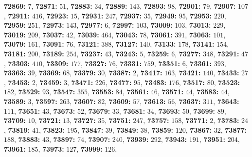 \textsf{\bfseries 72869:} $7$, \textsf{\bfseries 72871:} $51$, \textsf{\bfseries 72883:} $34$, \textsf{\bfseries 72889:} $143$, \textsf{\bfseries 72893:} $98$, \textsf{\bfseries 72901:} $79$, \textsf{\bfseries 72907:} $107$, \textsf{\bfseries 72911:} $416$, \textsf{\bfseries 72923:} $15$, \textsf{\bfseries 72931:} $247$, \textsf{\bfseries 72937:} $35$, \textsf{\bfseries 72949:} $95$, \textsf{\bfseries 72953:} $220$, \textsf{\bfseries 72959:} $251$, \textsf{\bfseries 72973:} $143$, \textsf{\bfseries 72977:} $6$, \textsf{\bfseries 72997:} $103$, \textsf{\bfseries 73009:} $103$, \textsf{\bfseries 73013:} $229$, \textsf{\bfseries 73019:} $209$, \textsf{\bfseries 73037:} $42$, \textsf{\bfseries 73039:} $464$, \textsf{\bfseries 73043:} $78$, \textsf{\bfseries 73061:} $391$, \textsf{\bfseries 73063:} $101$, \textsf{\bfseries 73079:} $161$, \textsf{\bfseries 73091:} $76$, \textsf{\bfseries 73121:} $388$, \textsf{\bfseries 73127:} $140$, \textsf{\bfseries 73133:} $178$, \textsf{\bfseries 73141:} $154$, \textsf{\bfseries 73181:} $200$, \textsf{\bfseries 73189:} $254$, \textsf{\bfseries 73237:} $43$, \textsf{\bfseries 73243:} $5$, \textsf{\bfseries 73259:} $6$, \textsf{\bfseries 73277:} $348$, \textsf{\bfseries 73291:} $47$, \textsf{\bfseries 73303:} $410$, \textsf{\bfseries 73309:} $177$, \textsf{\bfseries 73327:} $76$, \textsf{\bfseries 73331:} $759$, \textsf{\bfseries 73351:} $6$, \textsf{\bfseries 73361:} $393$, \textsf{\bfseries 73363:} $39$, \textsf{\bfseries 73369:} $68$, \textsf{\bfseries 73379:} $30$, \textsf{\bfseries 73387:} $2$, \textsf{\bfseries 73417:} $163$, \textsf{\bfseries 73421:} $140$, \textsf{\bfseries 73433:} $27$, \textsf{\bfseries 73453:} $2$, \textsf{\bfseries 73459:} $3$, \textsf{\bfseries 73471:} $226$, \textsf{\bfseries 73477:} $95$, \textsf{\bfseries 73483:} $176$, \textsf{\bfseries 73517:} $80$, \textsf{\bfseries 73523:} $182$, \textsf{\bfseries 73529:} $93$, \textsf{\bfseries 73547:} $355$, \textsf{\bfseries 73553:} $84$, \textsf{\bfseries 73561:} $46$, \textsf{\bfseries 73571:} $44$, \textsf{\bfseries 73583:} $44$, \textsf{\bfseries 73589:} $3$, \textsf{\bfseries 73597:} $263$, \textsf{\bfseries 73607:} $82$, \textsf{\bfseries 73609:} $57$, \textsf{\bfseries 73613:} $56$, \textsf{\bfseries 73637:} $311$, \textsf{\bfseries 73643:} $111$, \textsf{\bfseries 73651:} $43$, \textsf{\bfseries 73673:} $52$, \textsf{\bfseries 73679:} $33$, \textsf{\bfseries 73681:} $34$, \textsf{\bfseries 73693:} $50$, \textsf{\bfseries 73699:} $89$, \textsf{\bfseries 73709:} $10$, \textsf{\bfseries 73721:} $13$, \textsf{\bfseries 73727:} $35$, \textsf{\bfseries 73751:} $247$, \textsf{\bfseries 73757:} $158$, \textsf{\bfseries 73771:} $2$, \textsf{\bfseries 73783:} $24$, \textsf{\bfseries 73819:} $41$, \textsf{\bfseries 73823:} $195$, \textsf{\bfseries 73847:} $39$, \textsf{\bfseries 73849:} $38$, \textsf{\bfseries 73859:} $120$, \textsf{\bfseries 73867:} $32$, \textsf{\bfseries 73877:} $188$, \textsf{\bfseries 73883:} $43$, \textsf{\bfseries 73897:} $74$, \textsf{\bfseries 73907:} $240$, \textsf{\bfseries 73939:} $292$, \textsf{\bfseries 73943:} $191$, \textsf{\bfseries 73951:} $204$, \textsf{\bfseries 73961:} $185$, \textsf{\bfseries 73973:} $127$, \textsf{\bfseries 73999:} $126$, 
